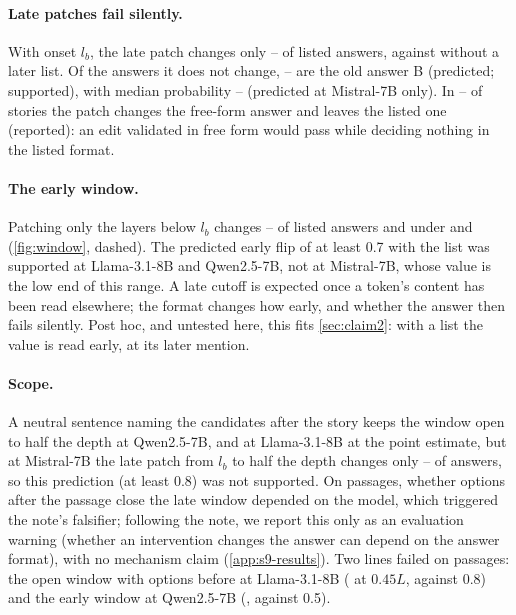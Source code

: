 \paragraph{Late patches fail silently.}
With onset $l_b$, the late patch changes only \NqLateListedMin--\NqLateListedMax{} of listed answers, against \NqLateFreeMin{} without a later list. Of the \fmtListA{} answers it does not change, \pctn{\NqSilentShareAfterMin}--\pct{\NqSilentShareAfterMax} are the old answer B (predicted; supported), with median probability \NqSilentPbAfterMin--\NqSilentPbAfterMax{} (predicted at Mistral-7B only). In \pctn{\NqInconsMin}--\pct{\NqInconsMax} of stories the patch changes the free-form answer and leaves the listed one (reported): an edit validated in free form would pass while deciding nothing in the listed format.

\paragraph{The early window.}
Patching only the layers below $l_b$ changes \NqPthreeEarlyListedMin--\NqPthreeEarlyListedMax{} of listed answers and \NqPthreeEarlyFreeMax{} under \fmtNone{} and \fmtBefore{} (\cref{fig:window}, dashed). The predicted early flip of at least 0.7 with the list was supported at Llama-3.1-8B and Qwen2.5-7B, not at Mistral-7B, whose \fmtListA{} value is the low end of this range. A late cutoff is expected once a token's content has been read elsewhere; the format changes how early, and whether the answer then fails silently. Post hoc, and untested here, this fits \cref{sec:claim2}: with a list the value is read early, at its later mention.

\paragraph{Scope.}
A neutral sentence naming the candidates after the story keeps the window open to half the depth at Qwen2.5-7B, and at Llama-3.1-8B at the point estimate, but at Mistral-7B the late patch from $l_b$ to half the depth changes only \NqPostLateFromLbMinMistralSeven--\NqPostLateFromLbMaxMistralSeven{} of answers, so this prediction (at least 0.8) was not supported. On passages, whether options after the passage close the late window depended on the model, which triggered the note's falsifier; following the note, we report this only as an evaluation warning (whether an intervention changes the answer can depend on the answer format), with no mechanism claim (\cref{app:s9-results}). Two lines failed on passages: the open window with options before at Llama-3.1-8B (\NqPsgLateOptbFortyfiveLlamaEight{} at $0.45L$, against 0.8) and the early window at Qwen2.5-7B (\NqPsgEarlyOptaThirtyQwenSeven, against 0.5).


